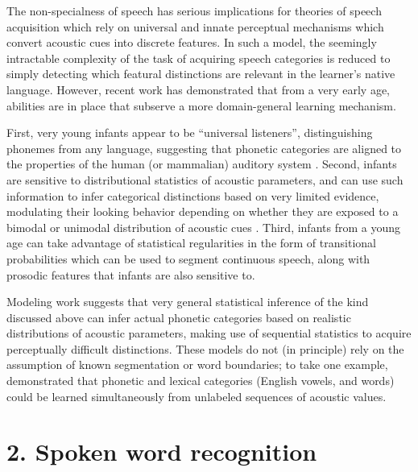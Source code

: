 \documentclass[11pt]{article}
\begin{document}
The non-specialness of speech has serious implications for theories of speech acquisition which rely on universal and innate perceptual mechanisms which convert acoustic cues into discrete features.  In such a model, the seemingly intractable complexity of the task of acquiring speech categories is reduced to simply detecting which featural distinctions are relevant in the learner's native language.  However, recent work has demonstrated that from a very early age, abilities are in place that subserve a more domain-general learning mechanism.

First, very young infants appear to be ``universal listeners'', distinguishing phonemes from any language, suggesting that phonetic categories are aligned to the properties of the human (or mammalian) auditory system \cite{Kuhl2004}.  Second, infants are sensitive to distributional statistics of acoustic parameters, and can use such information to infer categorical distinctions based on very limited evidence, modulating their looking behavior depending on whether they are exposed to a bimodal or unimodal distribution of acoustic cues \cite{Maye2002}.  Third, infants from a young age can take advantage of statistical regularities in the form of transitional probabilities which can be used to segment continuous speech, along with prosodic features that infants are also sensitive to.

Modeling work suggests that very general statistical inference of the kind discussed above can infer actual phonetic categories based on realistic distributions of acoustic parameters, making use of sequential statistics to acquire perceptually difficult distinctions.  These models do not (in principle) rely on the assumption of known segmentation or word boundaries; to take one example,  demonstrated that phonetic and lexical categories (English vowels, and words) could be learned simultaneously from unlabeled sequences of acoustic values.


\pagebreak
\section*{2. Spoken word recognition}
\label{sec:2.-spoken-word}

\end{document}
